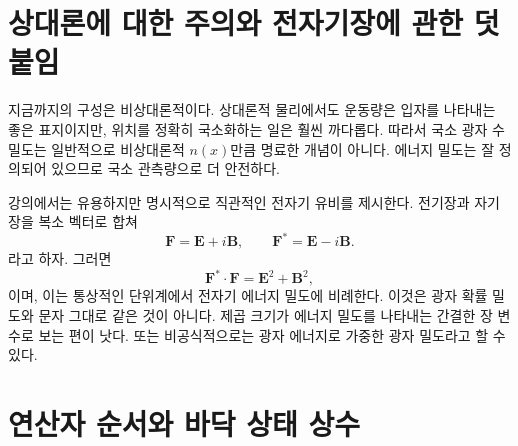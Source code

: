 \section{상대론에 대한 주의와 전자기장에 관한 덧붙임}

지금까지의 구성은 비상대론적이다. 상대론적 물리에서도 운동량은 입자를 나타내는 좋은 표지이지만, 위치를 정확히 국소화하는 일은 훨씬 까다롭다. 따라서 국소 광자 수 밀도는 일반적으로 비상대론적 \(n(x)\)만큼 명료한 개념이 아니다. 에너지 밀도는 잘 정의되어 있으므로 국소 관측량으로 더 안전하다.

강의에서는 유용하지만 명시적으로 직관적인 전자기 유비를 제시한다. 전기장과 자기장을 복소 벡터로 합쳐
\begin{equation}
\mathbf F=\mathbf E+i\mathbf B,
\qquad
\mathbf F^*=\mathbf E-i\mathbf B.
\label{eq:l07-riemann-silberstein}
\end{equation}
라고 하자. 그러면
\begin{equation}
\mathbf F^*\mathbin{\cdot}\mathbf F
=\mathbf E^2+\mathbf B^2,
\label{eq:l07-em-density}
\end{equation}
이며, 이는 통상적인 단위계에서 전자기 에너지 밀도에 비례한다. 이것은 광자 확률 밀도와 문자 그대로 같은 것이 아니다. 제곱 크기가 에너지 밀도를 나타내는 간결한 장 변수로 보는 편이 낫다. 또는 비공식적으로는 광자 에너지로 가중한 광자 밀도라고 할 수 있다.

\begin{classroomqa}
\end{classroomqa}

\begin{classroomqa}
\end{classroomqa}

\section{연산자 순서와 바닥 상태 상수}

